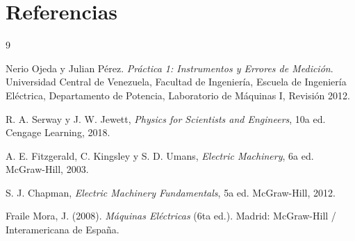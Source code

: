\pagebreak
\section{Referencias}

\begin{thebibliography}{9}

Nerio Ojeda y Julian Pérez. \emph{Práctica 1: Instrumentos y Errores de Medición}. Universidad Central de Venezuela, Facultad de Ingeniería, Escuela de Ingeniería Eléctrica, Departamento de Potencia, Laboratorio de Máquinas I, Revisión 2012.

R. A. Serway y J. W. Jewett, \emph{Physics for Scientists and Engineers}, 10a ed. Cengage Learning, 2018.

A. E. Fitzgerald, C. Kingsley y S. D. Umans, \emph{Electric Machinery}, 6a ed. McGraw-Hill, 2003.

S. J. Chapman, \emph{Electric Machinery Fundamentals}, 5a ed. McGraw-Hill, 2012.

Fraile Mora, J. (2008). \textit{Máquinas Eléctricas} (6ta ed.). Madrid: McGraw-Hill / Interamericana de España.

\end{thebibliography}
